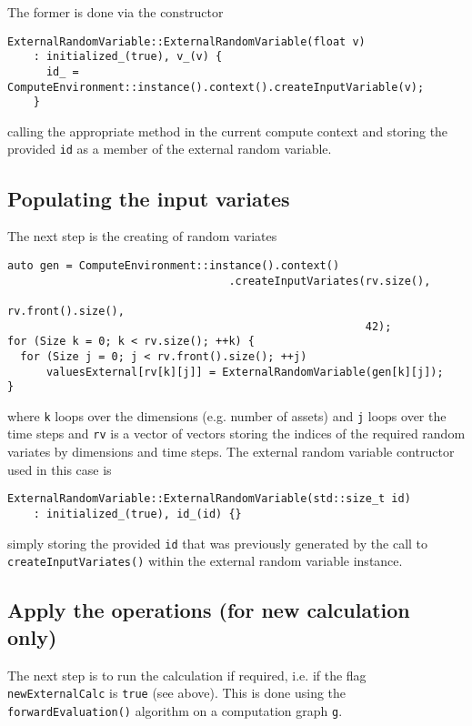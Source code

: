 \documentclass[12pt, a4paper]{article}
\begin{document}
The former is done via the constructor

\begin{verbatim}
ExternalRandomVariable::ExternalRandomVariable(float v)
    : initialized_(true), v_(v) {
      id_ = ComputeEnvironment::instance().context().createInputVariable(v);
    }
\end{verbatim}

calling the appropriate method in the current compute context and storing the provided \verb+id+ as a member of the
external random variable.

\subsection{Populating the input variates}

The next step is the creating of random variates

\begin{verbatim}
auto gen = ComputeEnvironment::instance().context()
                                  .createInputVariates(rv.size(),
                                                       rv.front().size(),
                                                       42);
for (Size k = 0; k < rv.size(); ++k) {
  for (Size j = 0; j < rv.front().size(); ++j)
      valuesExternal[rv[k][j]] = ExternalRandomVariable(gen[k][j]);
}
\end{verbatim}

where \verb+k+ loops over the dimensions (e.g. number of assets) and \verb+j+ loops over the time steps and \verb+rv+ is
a vector of vectors storing the indices of the required random variates by dimensions and time steps. The external
random variable contructor used in this case is

\begin{verbatim}
ExternalRandomVariable::ExternalRandomVariable(std::size_t id)
    : initialized_(true), id_(id) {}
\end{verbatim}

simply storing the provided \verb+id+ that was previously generated by the call to \verb+createInputVariates()+ within
the external random variable instance.

\subsection{Apply the operations (for new calculation only)}

The next step is to run the calculation if required, i.e. if the flag \verb+newExternalCalc+ is \verb+true+ (see
above). This is done using the \verb+forwardEvaluation()+ algorithm on a computation graph \verb+g+.
\end{document}
